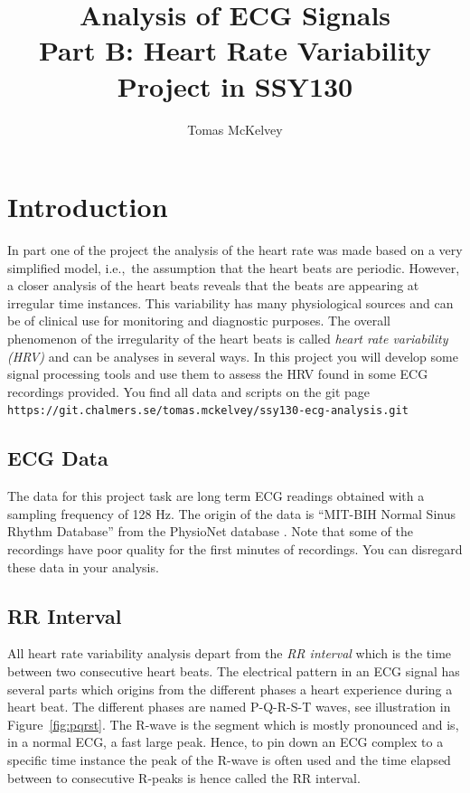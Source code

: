 \documentclass[12pt]{article}
\begin{document}
\title{Analysis of ECG Signals \\ Part B: Heart Rate Variability \\ Project in SSY130 }
\author{Tomas McKelvey}

\maketitle{}
\section{Introduction}
In part one of the project the analysis of the heart rate was made
based on a very simplified model, i.e.,\ the assumption that the heart
beats are periodic. However, a closer analysis of the heart beats
reveals that the beats are appearing at irregular time instances. This
variability has many physiological sources and can be of clinical use
for monitoring and diagnostic  purposes. The overall phenomenon of the
irregularity of the heart beats is called \emph{heart rate variability
  (HRV)} and can be analyses in several ways. In this project you will
develop some signal processing tools and use them to assess the
HRV found in some ECG recordings provided. You find all data and
scripts on the git page \texttt{https://git.chalmers.se/tomas.mckelvey/ssy130-ecg-analysis.git}

\subsection{ECG Data}
\label{sec:ecg-data}

The data for this project task are long term ECG readings obtained
with a sampling frequency of 128 Hz. The origin of the data is ``MIT-BIH Normal
Sinus Rhythm Database''  from the PhysioNet database
\cite{goldberger2000physiobank}.  Note that some of the recordings
have poor quality for the first minutes of recordings. You can
disregard these data in your analysis. 

\subsection{RR Interval}
\label{sec:r-r-interval}

All heart rate variability analysis depart from the \emph{RR
  interval} which is the time between two consecutive heart
beats.  The electrical pattern in an ECG signal has several parts which
origins from the different phases a heart experience during a heart
beat. The different phases are named P-Q-R-S-T waves, see illustration
in Figure~\ref{fig:pqrst}. The R-wave is the segment which is mostly
pronounced and is, in a normal ECG, a fast large peak. Hence, to pin down an ECG
complex to a specific time instance the peak of the R-wave is often used and
the time elapsed between to consecutive R-peaks is hence called the RR
interval.
\end{document}
